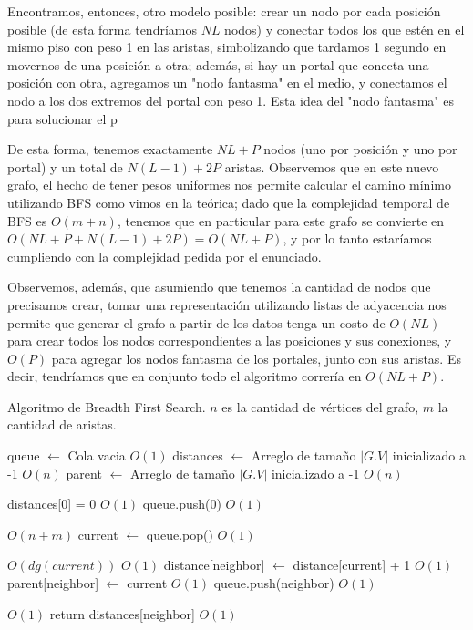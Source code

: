 \documentclass{article}
\theoremstyle{definition}
\theoremstyle{remark}
\begin{document}
Encontramos, entonces, otro modelo posible: crear un nodo por cada posición posible (de esta forma tendríamos $NL$ nodos) y conectar todos los que estén en el mismo piso con peso 1 en las aristas, simbolizando que tardamos 1 segundo en movernos de una posición a otra; además, si hay un portal que conecta una posición con otra, agregamos un "nodo fantasma" en el medio, y conectamos el nodo a los dos extremos del portal con peso 1. Esta idea del "nodo fantasma" es para solucionar el p

De esta forma, tenemos exactamente $NL + P$ nodos (uno por posición y uno por portal) y un total de $N (L-1) + 2P$ aristas. Observemos que en este nuevo grafo, el hecho de tener pesos uniformes nos permite calcular el camino mínimo utilizando BFS como vimos en la teórica; dado que la complejidad temporal de BFS es $O(m + n)$, tenemos que en particular para este grafo se convierte en $O(NL + P + N (L-1) + 2P) = O(NL + P)$, y por lo tanto estaríamos cumpliendo con la complejidad pedida por el enunciado.

Observemos, además, que asumiendo que tenemos la cantidad de nodos que precisamos crear, tomar una representación utilizando listas de adyacencia nos permite que generar el grafo a partir de los datos tenga un costo de $O(NL)$ para crear todos los nodos correspondientes a las posiciones y sus conexiones, y $O(P)$ para agregar los nodos fantasma de los portales, junto con sus aristas. Es decir, tendríamos que en conjunto todo el algoritmo correría en $O(NL + P)$.

\begin{algorithm}[h!]
\caption{Algoritmo de Breadth First Search. $n$ es la cantidad de vértices del grafo, $m$ la cantidad de aristas. \label{alg:bfs}}

\begin{algorithmic}[h!]
\State queue $\gets$ Cola vacia \Comment $O(1)$
\State distances $\gets$ Arreglo de tamaño $|G.V|$ inicializado a -1 \Comment $O(n)$
\State parent $\gets$ Arreglo de tamaño $|G.V|$ inicializado a -1 \Comment $O(n)$

\State distances[0] = 0 \Comment $O(1)$
\State queue.push(0) \Comment $O(1)$

 \Comment $O(n + m)$
    \State current $\gets$ queue.pop() \Comment $O(1)$
    
     \Comment $O(dg(current))$
         \Comment $O(1)$
            \State distance[neighbor] $\gets$ distance[current] + 1 \Comment $O(1)$
            \State parent[neighbor] $\gets$ current \Comment $O(1)$
            \State queue.push(neighbor) \Comment $O(1)$
        \EndIf
        
         \Comment $O(1)$
            \State return distances[neighbor] \Comment $O(1)$
        \EndIf
    \EndFor
\EndWhile
\EndProcedure
\end{algorithmic}
\end{algorithm}
\end{document}
